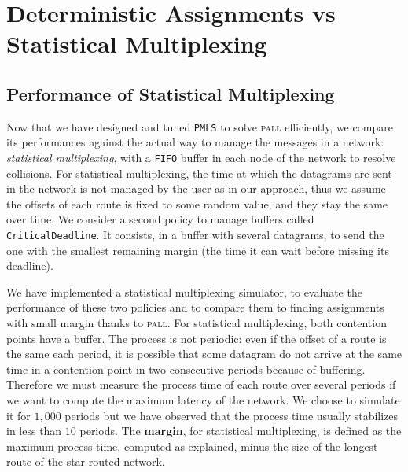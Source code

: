 \documentclass[a4paper,10pt]{article}
\newcommand\PMLS{\texttt{PMLS}\xspace}
\newcommand\FIFO{\texttt{FIFO}\xspace}
\newcommand\critdead{\texttt{CriticalDeadline}\xspace}
\newcommand\pall{\textsc{pall}\xspace}
\begin{document}
\section{Deterministic Assignments vs Statistical Multiplexing}\label{sec:comparison}

     \subsection{Performance of Statistical Multiplexing}

    
      Now that we have designed and tuned \PMLS to solve \pall efficiently, we compare its performances against the actual way to manage the messages in a network:  \emph{statistical multiplexing}, with a \FIFO buffer in each node of the network to resolve collisions. For statistical multiplexing, the time at which the datagrams are sent in the network is not managed by the user as in our approach, thus we assume the offsets of each route is fixed to some random value, and they stay the same over time.
     We consider a second policy to manage buffers called \critdead. It consists, in a buffer with several datagrams, to send the one with the smallest remaining margin (the time it can wait before missing its deadline).


  	We have implemented a statistical multiplexing simulator, to evaluate the performance of these two policies and to compare them to finding assignments with small margin thanks to \pall. 
  	For statistical multiplexing, both contention points have a buffer. The process is not periodic:
  	even if the offset of a route is the same each period, it is possible that some datagram do not arrive at the same time in a contention point in two consecutive periods because of buffering. Therefore we must measure the process time of each route over several periods if we want to compute the maximum latency of the network. We choose to simulate it for $1,000$ periods but we have observed that the process time usually stabilizes in less than $10$ periods. The \textbf{margin}, for statistical multiplexing, is defined as the maximum process time, computed as explained, minus the size of the longest route of the star routed network. 
	
\end{document}
